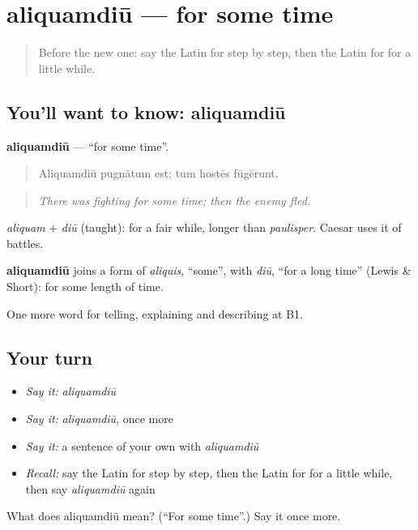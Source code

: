 \section[aliquamdiū]{aliquamdiū — for some time}

\label{lesson:LA-C293-aliquamdiu}



\begin{quote}
Before the new one: say the Latin for step by step, then the Latin for for a little while.
\end{quote}

\subsection*{You'll want to know: aliquamdiū}
\textbf{aliquamdiū} — \textquotedblleft{}for some time\textquotedblright{}.

\begin{quote}
Aliquamdiū pugnātum est; tum hostēs fūgērunt.
\end{quote}

\begin{quote}
\emph{There was fighting for some time; then the enemy fled.}
\end{quote}

\emph{aliquam} + \emph{diū} (taught): for a fair while, longer than \emph{paulisper}. Caesar uses it of battles.

\begin{cousinweb}
\textbf{aliquamdiū} joins a form of \emph{aliquis}, \textquotedblleft{}some\textquotedblright{}, with \emph{diū}, \textquotedblleft{}for a long time\textquotedblright{} (Lewis \& Short): for some length of time.
\end{cousinweb}

\begin{grammarlens}[title={What you've built}]
One more word for telling, explaining and describing at B1.
\end{grammarlens}

\subsection*{Your turn}
\begin{itemize}
\raggedright
  \item \emph{Say it:} \emph{aliquamdiū}
  \item \emph{Say it:} \emph{aliquamdiū}, once more
  \item \emph{Say it:} a sentence of your own with \emph{aliquamdiū}
  \item \emph{Recall:} say the Latin for step by step, then the Latin for for a little while, then say \emph{aliquamdiū} again
\end{itemize}

\begin{tcolorbox}[breakable,colback=teal!4,colframe=teal!35!black,title={Before you move on}]
What does aliquamdiū mean? (\textquotedblleft{}For some time\textquotedblright{}.) Say it once more.
\end{tcolorbox}
